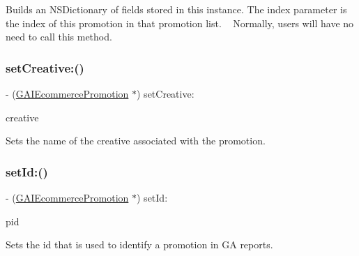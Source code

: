 Builds an N\+S\+Dictionary of fields stored in this instance. The index parameter is the index of this promotion in that promotion list. ~\newline
 Normally, users will have no need to call this method. \mbox{\label{interface_g_a_i_ecommerce_promotion_aec0c45811511765ec3a1dbd2c50bc91c}} 
\subsubsection{\texorpdfstring{set\+Creative\+:()}{setCreative:()}}
{\footnotesize\ttfamily -\/ (\hyperlink{interface_g_a_i_ecommerce_promotion}{G\+A\+I\+Ecommerce\+Promotion} $\ast$) set\+Creative\+: \begin{DoxyParamCaption}\item[{(N\+S\+String $\ast$)}]{creative }\end{DoxyParamCaption}}

Sets the name of the creative associated with the promotion. \mbox{\label{interface_g_a_i_ecommerce_promotion_a2fefc7d8bee1f757c3e557678c409fcf}} 
\subsubsection{\texorpdfstring{set\+Id\+:()}{setId:()}}
{\footnotesize\ttfamily -\/ (\hyperlink{interface_g_a_i_ecommerce_promotion}{G\+A\+I\+Ecommerce\+Promotion} $\ast$) set\+Id\+: \begin{DoxyParamCaption}\item[{(N\+S\+String $\ast$)}]{pid }\end{DoxyParamCaption}}

Sets the id that is used to identify a promotion in GA reports. \mbox{\label{interface_g_a_i_ecommerce_promotion_af4f2977a6b4cacb60af22f2ded88ec5c}} 
